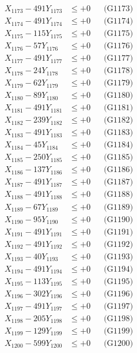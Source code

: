 \documentclass[a4paper,10pt]{article}
\begin{document}
{\begin{align}
X_{1173} - 491Y_{1173} &\leq +0 && \text{(G1173)} \\
X_{1174} - 491Y_{1174} &\leq +0 && \text{(G1174)} \\
X_{1175} - 115Y_{1175} &\leq +0 && \text{(G1175)} \\
X_{1176} - 57Y_{1176} &\leq +0 && \text{(G1176)} \\
X_{1177} - 491Y_{1177} &\leq +0 && \text{(G1177)} \\
X_{1178} - 24Y_{1178} &\leq +0 && \text{(G1178)} \\
X_{1179} - 62Y_{1179} &\leq +0 && \text{(G1179)} \\
X_{1180} - 89Y_{1180} &\leq +0 && \text{(G1180)} \\
\allowbreak
X_{1181} - 491Y_{1181} &\leq +0 && \text{(G1181)} \\
X_{1182} - 239Y_{1182} &\leq +0 && \text{(G1182)} \\
X_{1183} - 491Y_{1183} &\leq +0 && \text{(G1183)} \\
X_{1184} - 45Y_{1184} &\leq +0 && \text{(G1184)} \\
X_{1185} - 250Y_{1185} &\leq +0 && \text{(G1185)} \\
X_{1186} - 137Y_{1186} &\leq +0 && \text{(G1186)} \\
X_{1187} - 491Y_{1187} &\leq +0 && \text{(G1187)} \\
X_{1188} - 491Y_{1188} &\leq +0 && \text{(G1188)} \\
X_{1189} - 67Y_{1189} &\leq +0 && \text{(G1189)} \\
X_{1190} - 95Y_{1190} &\leq +0 && \text{(G1190)} \\
\allowbreak
X_{1191} - 491Y_{1191} &\leq +0 && \text{(G1191)} \\
X_{1192} - 491Y_{1192} &\leq +0 && \text{(G1192)} \\
X_{1193} - 40Y_{1193} &\leq +0 && \text{(G1193)} \\
X_{1194} - 491Y_{1194} &\leq +0 && \text{(G1194)} \\
X_{1195} - 113Y_{1195} &\leq +0 && \text{(G1195)} \\
X_{1196} - 302Y_{1196} &\leq +0 && \text{(G1196)} \\
X_{1197} - 491Y_{1197} &\leq +0 && \text{(G1197)} \\
X_{1198} - 205Y_{1198} &\leq +0 && \text{(G1198)} \\
X_{1199} - 129Y_{1199} &\leq +0 && \text{(G1199)} \\
X_{1200} - 599Y_{1200} &\leq +0 && \text{(G1200)} \\

\end{align}}
\end{document}
